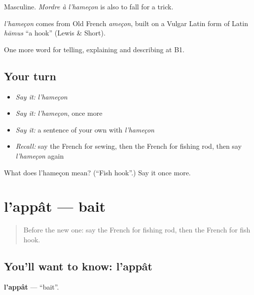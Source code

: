 Masculine. \emph{Mordre à l'hameçon} is also to fall for a trick.

\begin{cousinweb}
\emph{l'hameçon} comes from Old French \emph{ameçon}, built on a Vulgar Latin form of Latin \emph{hāmus} \textquotedblleft{}a hook\textquotedblright{} (Lewis \& Short).
\end{cousinweb}

\begin{grammarlens}[title={What you've built}]
One more word for telling, explaining and describing at B1.
\end{grammarlens}

\subsection*{Your turn}
\begin{itemize}
\raggedright
  \item \emph{Say it:} \emph{l'hameçon}
  \item \emph{Say it:} \emph{l'hameçon}, once more
  \item \emph{Say it:} a sentence of your own with \emph{l'hameçon}
  \item \emph{Recall:} say the French for sewing, then the French for fishing rod, then say \emph{l'hameçon} again
\end{itemize}

\begin{tcolorbox}[breakable,colback=teal!4,colframe=teal!35!black,title={Before you move on}]
What does l'hameçon mean? (\textquotedblleft{}Fish hook\textquotedblright{}.) Say it once more.
\end{tcolorbox}
\section[l'appât]{l'appât — bait}

\label{lesson:FR-C497-appat}



\begin{quote}
Before the new one: say the French for fishing rod, then the French for fish hook.
\end{quote}

\subsection*{You'll want to know: l'appât}
\textbf{l'appât} — \textquotedblleft{}bait\textquotedblright{}.


